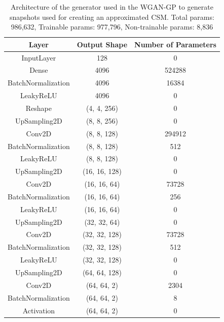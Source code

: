 \documentclass[11pt,a4paper,twoside]{report}
\begin{document}
\begin{table}[]
  \centering
  \begin{tabular}{c c c}
      \hline
      \textbf{Layer} & \textbf{Output Shape} & \textbf{Number of Parameters} \\ \hline
      InputLayer            & 128           & 0                 \\
      Dense                 & 4096          & 524288            \\
      BatchNormalization    & 4096          & 16384             \\
      LeakyReLU             & 4096          & 0                 \\
      Reshape               & (4, 4, 256)   & 0                 \\
      UpSampling2D          & (8, 8, 256)   & 0                 \\
      Conv2D                & (8, 8, 128)   & 294912            \\
      BatchNormalization    & (8, 8, 128)   & 512               \\
      LeakyReLU             & (8, 8, 128)   & 0                 \\
      UpSampling2D          & (16, 16, 128) & 0                 \\
      Conv2D                & (16, 16, 64)  & 73728             \\
      BatchNormalization    & (16, 16, 64)  & 256               \\
      LeakyReLU             & (16, 16, 64)  & 0                 \\
      UpSampling2D          & (32, 32, 64)  & 0                 \\
      Conv2D                & (32, 32, 128) & 73728             \\
      BatchNormalization    & (32, 32, 128) & 512               \\
      LeakyReLU             & (32, 32, 128) & 0                 \\
      UpSampling2D          & (64, 64, 128) & 0                 \\
      Conv2D                & (64, 64, 2)   & 2304              \\
      BatchNormalization    & (64, 64, 2)   & 8                 \\
      Activation            & (64, 64, 2)   & 0                 \\
      \end{tabular}
  \caption{Architecture of the generator used in the WGAN-GP to generate snapshots used for creating an approximated CSM. Total params: 986,632, Trainable params: 977,796, Non-trainable params: 8,836}
  \label{tab:snapshots_generator_WGANGP_architecture}
\end{table}
\end{document}
